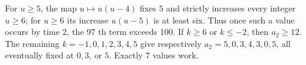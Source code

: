 For $u\ge5$, the map $u\mapsto u(u-4)$ fixes $5$ and strictly increases every integer $u\ge6$; for $u\ge6$ its increase $u(u-5)$ is at least six. Thus once such a value occurs by time 2, the 97 th term exceeds 100. If $k\ge6$ or $k\le-2$, then $a_2\ge12$. The remaining $k=-1,0,1,2,3,4,5$ give respectively $a_2=5,0,3,4,3,0,5$, all eventually fixed at $0,3$, or $5$. Exactly $\boxed7$ values work.
